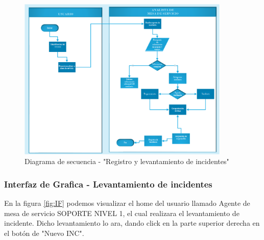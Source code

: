 \begin{figure}[H]
	\centering
	\includegraphics[width=0.9\textwidth]{Capitulo4/Img/Regitro_de_Incidente}
	\caption{Diagrama de secuencia - "Registro y levantamiento de incidentes"}
	\label{fig:DSLDI}
\end{figure}

\subsubsection{Interfaz de Grafica - Levantamiento de incidentes}
 En la figura \ref{fig:IF} podemos visualizar el home del usuario llamado Agente de mesa de servicio SOPORTE NIVEL 1, el cual realizara el levantamiento de incidente. Dicho levantamiento lo ara, dando click en la parte superior derecha en el botón de "Nuevo INC".
 

